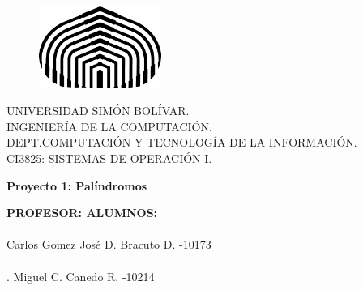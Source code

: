 \documentclass[12pt,letterpaper]{article}
\begin{document}
\begin{titlepage}
	\vspace*{-0.5in}
    \begin{figure}[h]
    	\includegraphics[width=4cm, left]{logoUSB.png}
    \end{figure}
    \noindent UNIVERSIDAD SIMÓN BOLÍVAR.\\
    \noindent INGENIERÍA DE LA COMPUTACIÓN.\\
    \noindent DEPT.COMPUTACIÓN Y TECNOLOGÍA DE LA INFORMACIÓN.\\
    \noindent CI3825: SISTEMAS DE OPERACIÓN I.\\

    \vspace*{1.8in}
    \begin{center}
      \begin{Huge}
      	\textbf{Proyecto 1: Palíndromos} \\
      \end{Huge}
    \end{center}

\vspace*{2.2in}

      \noindent \textbf{\large PROFESOR: \quad \quad \quad \quad \quad \quad \quad \quad \quad \quad \quad \quad \quad ALUMNOS:} \\ \\
     Carlos Gomez \quad \quad \quad \quad \quad \quad \quad \quad \quad \quad \quad \quad \quad \quad \quad \quad \quad José D. Bracuto D. -10173\\ \\
      . \qquad \quad \quad \quad \quad \quad \quad \quad \quad \quad \quad \quad \quad \quad \quad \quad \quad \quad \quad \quad \quad Miguel C. Canedo R. -10214
      
\end{titlepage}

\tableofcontents
\clearpage
\end{document}
